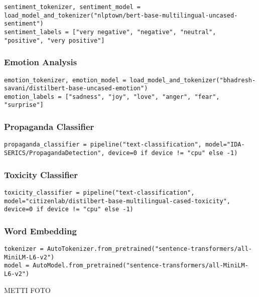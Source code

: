 \documentclass[12pt]{article}
\begin{document}
	\begin{lstlisting}
sentiment_tokenizer, sentiment_model = load_model_and_tokenizer("nlptown/bert-base-multilingual-uncased-sentiment")
sentiment_labels = ["very negative", "negative", "neutral", "positive", "very positive"]
	\end{lstlisting}
	
		\subsubsection{Emotion Analysis}
		
	\begin{lstlisting}
emotion_tokenizer, emotion_model = load_model_and_tokenizer("bhadresh-savani/distilbert-base-uncased-emotion")
emotion_labels = ["sadness", "joy", "love", "anger", "fear", "surprise"]
	\end{lstlisting}
	
		\subsubsection{Propaganda Classifier}
		
	\begin{lstlisting}
propaganda_classifier = pipeline("text-classification", model="IDA-SERICS/PropagandaDetection", device=0 if device != "cpu" else -1)
	\end{lstlisting}

		\subsubsection{Toxicity Classifier}
	\begin{lstlisting}
toxicity_classifier = pipeline("text-classification", model="citizenlab/distilbert-base-multilingual-cased-toxicity", device=0 if device != "cpu" else -1)
	\end{lstlisting}
	
		\subsubsection{Word Embedding}
	\begin{lstlisting}
tokenizer = AutoTokenizer.from_pretrained("sentence-transformers/all-MiniLM-L6-v2")
model = AutoModel.from_pretrained("sentence-transformers/all-MiniLM-L6-v2")
	\end{lstlisting}

\newpage
	\textsc{\large METTI FOTO}\\[0.2cm]
\end{document}
